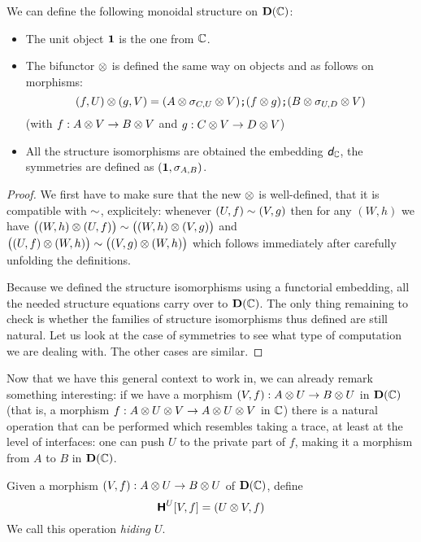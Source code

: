 \begin{proposition}
	We can define the following monoidal structure on $\mathbf D(\mathbb{C})$:
	\begin{itemize}
		\item The unit object $\mathbf 1$ is the one from $\mathbb{C}$.
		\item The bifunctor $\otimes$ is defined the same way on objects and as follows on morphisms:
		$$(f,U)\otimes(g,V)=(A\otimes \sigma_{C,U}\otimes V)\textbf{\tt;}(f\otimes g)\textbf{\tt;}(B\otimes \sigma_{U,D}\otimes V)
		$$
		(with $f:A\otimes V\rightarrow B\otimes V$ and $g:C\otimes V\rightarrow D\otimes V$)
		\item All the structure isomorphisms are obtained \via the embedding $\textit{\textsf{d}}_{\mathbb{C}}$, \eg the
		symmetries are defined as $(\mathbf 1,\sigma_{A,B})$.
	\end{itemize}
\end{proposition}

\begin{proof}
	We first have to make sure that the new $\otimes$ is well-defined, \ie that it is compatible with
	$\sim$, explicitely: whenever $(U,f)\sim(V,g)$ then for any $(W,h)$ we have 
	$\big((W,h)\otimes(U,f)\big)\sim\big((W,h)\otimes(V,g)\big)$ and 
	$\big((U,f)\otimes(W,h)\big)\sim\big((V,g)\otimes(W,h)\big)$ which follows immediately after carefully
	unfolding the definitions.

	Because we defined the structure isomorphisms using a functorial embedding, all the needed
	structure equations carry over to $\mathbf D(\mathbb{C})$. The only thing remaining to check is whether
	the families of structure isomorphisms thus defined are still natural.
	Let us look at the case of symmetries to see what type of computation we are dealing with. The
	other cases are similar.
	
\end{proof}

Now that we have this general context to work in, we can already remark something interesting:
if we have a morphism $(V,f):A\otimes U\rightarrow B\otimes U$ in $\mathbf D(\mathbb{C})$ (that is, a morphism
$f:A\otimes U\otimes V\rightarrow A\otimes U\otimes V$ in $\mathbb{C}$) there is a natural operation that can be
performed which resembles taking a trace, at least at the level of interfaces: one can push $U$
to the private part of $f$, making it a morphism from $A$ to $B$ in $\mathbf D(\mathbb{C})$.

\begin{definition}[Hiding]
	Given a morphism $(V,f):A\otimes U\rightarrow B\otimes U$ of $\mathbf D(\mathbb{C})$, define 
	$${\normalfont\textsf{\textbf{H}}^{U}}[V,f]=(U\otimes V,f)$$
	We call this operation \emph{hiding $U$}.
\end{definition}

